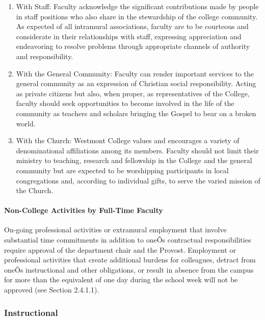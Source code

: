 \documentclass[letterpaper, 11pt]{article}
\begin{document}
\begin{enumerate}[label=\alph*)]
					\item{With Staff:  Faculty acknowledge the significant contributions made by people in staff positions who also share in the stewardship of the college community.  As expected of all intramural associations, faculty are to be courteous and considerate in their relationships with staff, expressing appreciation and endeavoring to resolve problems through appropriate channels of authority and responsibility.}
					\item{With the General Community:  Faculty can render important services to the general community as an expression of Christian social responsibility.  Acting as private citizens but also, when proper, as representatives of the College, faculty should seek opportunities to become involved in the life of the community as teachers and scholars bringing the Gospel to bear on a broken world.}
					\item{With the Church:  Westmont College values and encourages a variety of denominational affiliations among its members.  Faculty should not limit their ministry to teaching, research and fellowship in the College and the general community but are expected to be worshipping participants in local congregations and, according to individual gifts, to serve the varied mission of the Church.}
				\end{enumerate}
			\paragraph{Non-College Activities by Full-Time Faculty}
				On-going professional activities or extramural employment that involve substantial time commitments in addition to oneÕs contractual responsibilities require approval of the department chair and the Provost.  Employment or professional activities that create additional burdens for colleagues, detract from oneÕs instructional and other obligations, or result in absence from the campus for more than the equivalent of one day during the school week will not be approved (see Section 2.4.1.1).
		\subsubsection{Instructional}
\end{document}
